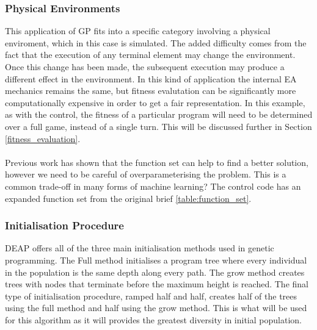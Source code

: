 \documentclass{article}
\begin{document}
\subsubsection{Physical Environments}
This application of GP fits into a specific category involving a physical enviroment, which in this case is simulated. The added difficulty comes from the fact that the execution of any terminal element may change the environment. Once this change has been made, the subsequent execution may produce a different effect in the environment. In this kind of application the internal EA mechanics remains the same, but fitness evalutation can be significantly more computationally expensive\cite[p. 110]{textbook} in order to get a fair representation. In this example, as with the control, the fitness of a particular program will need to be determined over a full game, instead of a single turn. This will be discussed further in Section \ref{fitness_evaluation}.
\\\\
Previous work has shown that the function set can help to find a better solution, however we need to be careful of overparameterising the problem.%
This is a common trade-off in many forms of machine learning?
The control code has an expanded function set from the original brief
\ref{table:function_set}.

\subsubsection{Initialisation Procedure}
DEAP offers all of the three main initialisation methods used in genetic programming. The Full method initialises a program tree where every individual in the population is the same depth along every path. The grow method creates trees with nodes that terminate before the maximum height is reached. The final type of initialisation procedure, ramped half and half, creates half of the trees using the full method and half using the grow method. This is what will be used for this algorithm as it will provides the greatest diversity in initial population.
\end{document}
